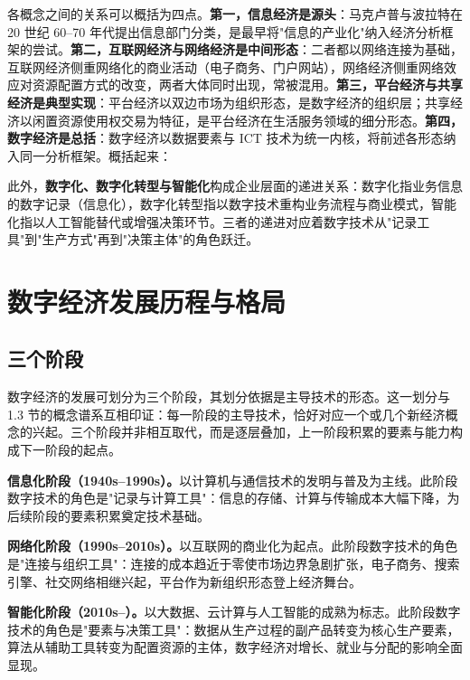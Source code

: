 各概念之间的关系可以概括为四点。\textbf{第一，信息经济是源头}：马克卢普与波拉特在 20 世纪 60--70 年代提出信息部门分类，是最早将"信息的产业化"纳入经济分析框架的尝试。\textbf{第二，互联网经济与网络经济是中间形态}：二者都以网络连接为基础，互联网经济侧重网络化的商业活动（电子商务、门户网站），网络经济侧重网络效应对资源配置方式的改变，两者大体同时出现，常被混用。\textbf{第三，平台经济与共享经济是典型实现}：平台经济以双边市场为组织形态，是数字经济的组织层；共享经济以闲置资源使用权交易为特征，是平台经济在生活服务领域的细分形态。\textbf{第四，数字经济是总括}：数字经济以数据要素与 ICT 技术为统一内核，将前述各形态纳入同一分析框架。概括起来：

此外，\textbf{数字化、数字化转型与智能化}构成企业层面的递进关系：数字化指业务信息的数字记录（信息化），数字化转型指以数字技术重构业务流程与商业模式，智能化指以人工智能替代或增强决策环节。三者的递进对应着数字技术从"记录工具"到"生产方式"再到"决策主体"的角色跃迁。

\section{数字经济发展历程与格局}

\subsection{三个阶段}

数字经济的发展可划分为三个阶段，其划分依据是主导技术的形态。这一划分与 1.3 节的概念谱系互相印证：每一阶段的主导技术，恰好对应一个或几个新经济概念的兴起。三个阶段并非相互取代，而是逐层叠加，上一阶段积累的要素与能力构成下一阶段的起点。

\textbf{信息化阶段（1940s--1990s）。}以计算机与通信技术的发明与普及为主线。此阶段数字技术的角色是"记录与计算工具"：信息的存储、计算与传输成本大幅下降，为后续阶段的要素积累奠定技术基础。

\textbf{网络化阶段（1990s--2010s）。}以互联网的商业化为起点。此阶段数字技术的角色是"连接与组织工具"：连接的成本趋近于零使市场边界急剧扩张，电子商务、搜索引擎、社交网络相继兴起，平台作为新组织形态登上经济舞台。

\textbf{智能化阶段（2010s--）。}以大数据、云计算与人工智能的成熟为标志。此阶段数字技术的角色是"要素与决策工具"：数据从生产过程的副产品转变为核心生产要素，算法从辅助工具转变为配置资源的主体，数字经济对增长、就业与分配的影响全面显现。

